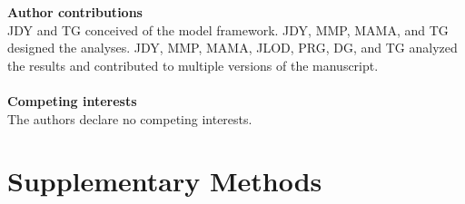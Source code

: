 \documentclass[twocolumn,preprintnumbers,amsmath,amssymb,superscriptaddress,linenumbers]{revtex4-1}
\newcommand{\beginsupplement}{%
        \clearpage
        \setcounter{table}{0}
        \renewcommand{\thetable}{S\arabic{table}}%
        \setcounter{figure}{0}
        \renewcommand{\thefigure}{S\arabic{figure}}%
        \setcounter{equation}{0}
        \renewcommand{\theequation}{S\arabic{equation}}
     }
\begin{document}
\noindent \textbf{Author contributions}\\
  \footnotesize{
  JDY and TG conceived of the model framework. JDY, MMP, MAMA, and TG designed the analyses. JDY, MMP, MAMA, JLOD, PRG, DG, and TG analyzed the results and contributed to multiple versions of the manuscript.
  }\\ \\
\noindent \textbf{Competing interests}\\
  \footnotesize{
  The authors declare no competing interests.
  }
\clearpage

\clearpage


\beginsupplement


\section*{Supplementary Methods}

% 
\end{document}
